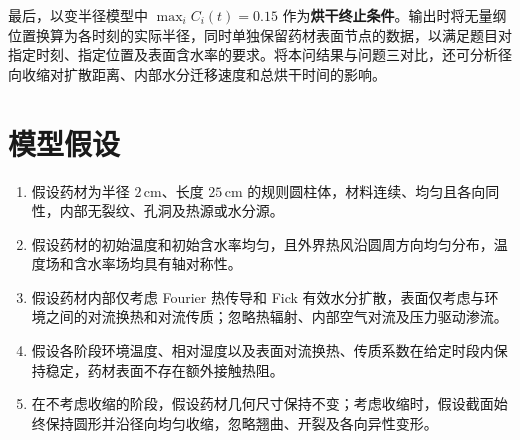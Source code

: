 \documentclass[12pt,a4paper,fontset=none]{ctexart}
\begin{document}
最后，以变半径模型中 $\max_i C_i(t)=0.15$ 作为\textbf{烘干终止条件}。输出时将无量纲位置换算为各时刻的实际半径，同时单独保留药材表面节点的数据，以满足题目对指定时刻、指定位置及表面含水率的要求。将本问结果与问题三对比，还可分析径向收缩对扩散距离、内部水分迁移速度和总烘干时间的影响。



\section{模型假设}
\begin{enumerate}[
  label=\arabic*.,
  leftmargin=1.22cm,
  labelsep=0.28cm,
  itemsep=0.10cm,
  topsep=0pt,
  parsep=0pt
]

  \item 假设药材为半径 $2\,\mathrm{cm}$、长度 $25\,\mathrm{cm}$ 的规则圆柱体，材料连续、均匀且各向同性，内部无裂纹、孔洞及热源或水分源。

  \item 假设药材的初始温度和初始含水率均匀，且外界热风沿圆周方向均匀分布，温度场和含水率场均具有轴对称性。

  \item 假设药材内部仅考虑 Fourier 热传导和 Fick 有效水分扩散，表面仅考虑与环境之间的对流换热和对流传质；忽略热辐射、内部空气对流及压力驱动渗流。

  \item 假设各阶段环境温度、相对湿度以及表面对流换热、传质系数在给定时段内保持稳定，药材表面不存在额外接触热阻。

  \item 在不考虑收缩的阶段，假设药材几何尺寸保持不变；考虑收缩时，假设截面始终保持圆形并沿径向均匀收缩，忽略翘曲、开裂及各向异性变形。

\end{enumerate}
\end{document}
